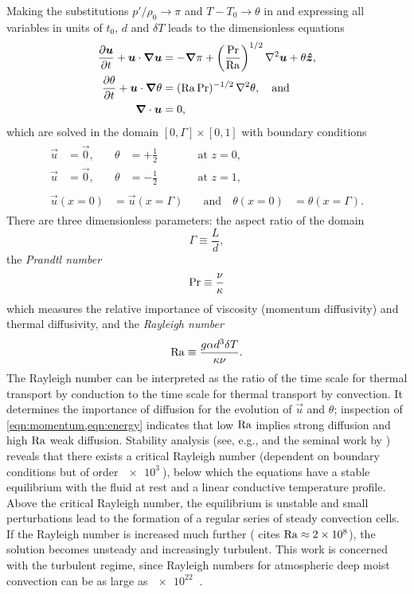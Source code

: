 \documentclass[../main.tex]{subfiles}
\begin{document}
Making the substitutions $p'/\rho_0 \to \pi$ and $T - T_0 \to \theta$ in
 and expressing all variables in
units of $t_0$, $d$ and $\delta T$ leads to the dimensionless equations
\begin{align}
    \label{eqn:momentum}
    \frac{\partial \bm{u}}{\partial t} + \bm{u} \cdot \bm{\nabla} \bm{u}
        &= -\bm{\nabla} \pi + \left( \frac{\mathrm{Pr}}{\mathrm{Ra}}\right)^{1/2}
        \nabla^2 \bm{u} + \theta \bm{\hat{z}}, \\
    \label{eqn:energy}
    \frac{\partial \theta}{\partial t} + \bm{u} \cdot \bm{\nabla} \theta
        &= (\mathrm{Ra}\,\mathrm{Pr})^{-1/2} \, \nabla^2 \theta, \quad \text{and} \\
    \label{eqn:incompressible}
    \bm{\nabla} \cdot \bm{u} &= 0,
\end{align}
which are solved in the domain $[0, \Gamma] \times [0, 1]$ with boundary
conditions
\begin{gather}
\begin{alignat}{3}
    \label{eqn:bc_bot}
    \vec{u} &= \vec{0}, &\quad \theta &= +\frac{1}{2}
    &\qquad& \text{at } z = 0, \\
    \label{eqn:bc_top}
    \vec{u} &= \vec{0}, &\quad \theta &= -\frac{1}{2}
    &\qquad& \text{at } z = 1,
\end{alignat} \\
\begin{alignat}{2}
    \label{eqn:bc_sides}
    \vec{u}(x=0) &= \vec{u}(x=\Gamma)
    &\quad \text{and} \quad \theta(x=0) &= \theta(x=\Gamma).
\end{alignat}
\end{gather}
There are three dimensionless parameters: the aspect ratio of the domain
\[
    \Gamma \equiv \frac{L}{d},
\]
the \emph{Prandtl number}
\[
    \mathrm{Pr} \equiv \frac{\nu}{\kappa}
\]
which measures the relative importance of viscosity (momentum diffusivity) and
thermal diffusivity, and the \emph{Rayleigh number}
\[
    \mathrm{Ra} \equiv \frac{g \alpha d^3 \delta T}{\kappa \nu}.
\]
The Rayleigh number can be interpreted as the ratio of the time scale for
thermal transport by conduction to the time scale for thermal transport by
convection. It determines the importance of diffusion for the evolution of
$\vec{u}$ and $\theta$; inspection of \cref{eqn:momentum,eqn:energy} indicates
that low $\mathrm{Ra}$ implies strong diffusion and high $\mathrm{Ra}$ weak
diffusion. Stability analysis (see, e.g., \textcite{chandrasekhar1961} and the
seminal work by \textcite{rayleigh1916}) reveals that there exists a critical
Rayleigh number (dependent on boundary conditions but of order $\SI{e3}{}$),
below which the equations have a stable equilibrium with the fluid at rest and
a linear conductive temperature profile. Above the critical Rayleigh number,
the equilibrium is unstable and small perturbations lead to the formation of a
regular series of steady convection cells. If the Rayleigh number is increased
much further (\textcite{le_quere1991} cites $\mathrm{Ra} \approx \SI{2e8}{}$),
the solution becomes unsteady and increasingly turbulent. This work is
concerned with the turbulent regime, since Rayleigh numbers for atmospheric
deep moist convection can be as large as $\SI{e22}{}$ \parencite{chilla2012}.
\end{document}
